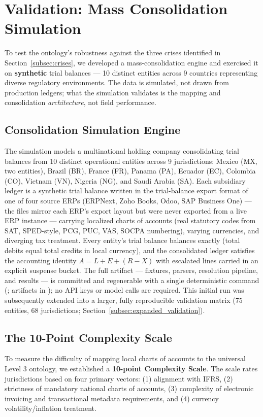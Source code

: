 \section{Validation: Mass Consolidation Simulation}
\label{sec:evaluation}

To test the ontology's robustness against the three crises identified in Section~\ref{subsec:crises}, we developed a mass-consolidation engine and exercised it on \textbf{synthetic} trial balances --- 10 distinct entities across 9 countries representing diverse regulatory environments. The data is simulated, not drawn from production ledgers; what the simulation validates is the mapping and consolidation \emph{architecture}, not field performance.

\subsection{Consolidation Simulation Engine}
The simulation models a multinational holding company consolidating trial balances from 10 distinct operational entities across 9 jurisdictions: Mexico (MX, two entities), Brazil (BR), France (FR), Panama (PA), Ecuador (EC), Colombia (CO), Vietnam (VN), Nigeria (NG), and Saudi Arabia (SA). Each subsidiary ledger is a synthetic trial balance written in the trial-balance export format of one of four source ERPs (ERPNext, Zoho Books, Odoo, SAP Business One) --- the files mirror each ERP's export layout but were never exported from a live ERP instance --- carrying localized charts of accounts (real statutory codes from SAT, SPED-style, PCG, PUC, VAS, SOCPA numbering), varying currencies, and diverging tax treatment. Every entity's trial balance balances exactly (total debits equal total credits in local currency), and the consolidated ledger satisfies the accounting identity $A = L + E + (R - X)$ with escalated lines carried in an explicit suspense bucket. The full artifact --- fixtures, parsers, resolution pipeline, and results --- is committed and regenerable with a single deterministic command (; artifacts in ); no API keys or model calls are required. This initial run was subsequently extended into a larger, fully reproducible validation matrix (75 entities, 68 jurisdictions; Section~\ref{subsec:expanded_validation}).

\subsection{The 10-Point Complexity Scale}
To measure the difficulty of mapping local charts of accounts to the universal Level 3 ontology, we established a \textbf{10-point Complexity Scale}. The scale rates jurisdictions based on four primary vectors: (1) alignment with IFRS, (2) strictness of mandatory national charts of accounts, (3) complexity of electronic invoicing and transactional metadata requirements, and (4) currency volatility/inflation treatment. 

